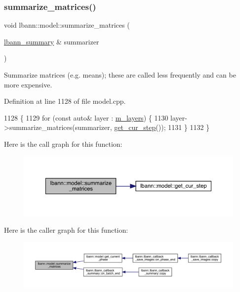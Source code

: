 \subsubsection{\texorpdfstring{summarize\+\_\+matrices()}{summarize\_matrices()}}
{\footnotesize\ttfamily void lbann\+::model\+::summarize\+\_\+matrices (\begin{DoxyParamCaption}\item[{\hyperlink{classlbann_1_1lbann__summary}{lbann\+\_\+summary} \&}]{summarizer }\end{DoxyParamCaption})\hspace{0.3cm}{\ttfamily [virtual]}}

Summarize matrices (e.\+g. means); these are called less frequently and can be more expensive. 

Definition at line 1128 of file model.\+cpp.


\begin{DoxyCode}
1128                                                         \{
1129   \textcolor{keywordflow}{for} (\textcolor{keyword}{const} \textcolor{keyword}{auto}& layer : \hyperlink{classlbann_1_1model_a0229fc226ec163d1411548446104569d}{m\_layers}) \{
1130     layer->summarize\_matrices(summarizer, \hyperlink{classlbann_1_1model_ad0cdcba177434b52dc9c4a97be183a92}{get\_cur\_step}());
1131   \}
1132 \}
\end{DoxyCode}
Here is the call graph for this function\+:\nopagebreak
\begin{figure}[H]
\begin{center}
\leavevmode
\includegraphics[width=350pt]{classlbann_1_1model_a0824e757e4806fad77630d69926a8911_cgraph}
\end{center}
\end{figure}
Here is the caller graph for this function\+:\nopagebreak
\begin{figure}[H]
\begin{center}
\leavevmode
\includegraphics[width=350pt]{classlbann_1_1model_a0824e757e4806fad77630d69926a8911_icgraph}
\end{center}
\end{figure}
\mbox{\label{classlbann_1_1model_a1eb5efcc8f73ba9478b2ce1efb9f2d8c}} 
